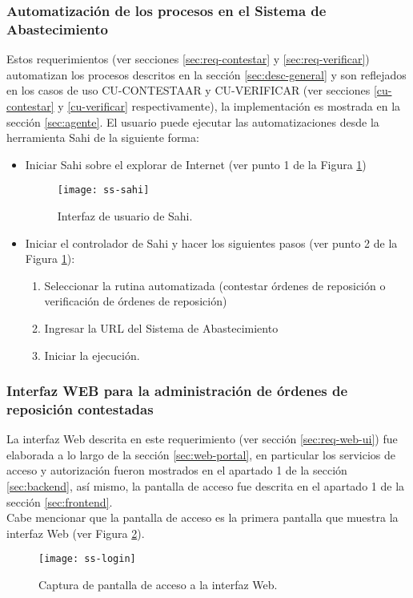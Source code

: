 \subsubsection{Automatización de los procesos en el Sistema de Abastecimiento}
Estos requerimientos (ver secciones \ref{sec:req-contestar} y \ref{sec:req-verificar}) automatizan los procesos descritos en la sección \ref{sec:desc-general} y son reflejados en los casos de uso CU-CONTESTAAR y CU-VERIFICAR (ver secciones \ref{cu-contestar} y \ref{cu-verificar} respectivamente), la implementación es mostrada en la sección \ref{sec:agente}. El usuario puede ejecutar las automatizaciones desde la herramienta Sahi de la siguiente forma:
\begin{itemize}
	\item Iniciar Sahi sobre el explorar de Internet (ver punto 1 de la Figura \ref{fig:ss-sahi})
	\begin{figure}[h]
		\centering
		\texttt{[image: ss-sahi]}
		\caption{Interfaz de usuario de Sahi.}
		\label{fig:ss-sahi}
	\end{figure}

	\item Iniciar el controlador de Sahi y hacer los siguientes pasos (ver punto 2 de la Figura \ref{fig:ss-sahi}):
	\begin{enumerate}
		\item Seleccionar la rutina automatizada (contestar órdenes de reposición o verificación de órdenes de reposición)
		\item Ingresar la URL del Sistema de Abastecimiento
		\item Iniciar la ejecución.
	\end{enumerate}
\end{itemize}

\subsubsection{Interfaz WEB para la administración de órdenes de reposición contestadas}
La interfaz Web descrita en este requerimiento (ver sección \ref{sec:req-web-ui}) fue elaborada a lo largo de la sección \ref{sec:web-portal}, en particular los servicios de acceso y autorización fueron mostrados en el apartado 1 de la sección \ref{sec:backend}, así mismo, la pantalla de acceso fue descrita en el apartado 1 de la sección \ref{sec:frontend}.\\
Cabe mencionar que la pantalla de acceso es la primera pantalla que muestra la interfaz Web (ver Figura \ref{fig:ss-login}).
\begin{figure}[h]
	\centering
	\texttt{[image: ss-login]}
	\caption{Captura de pantalla de acceso a la interfaz Web.}
	\label{fig:ss-login}
\end{figure}

